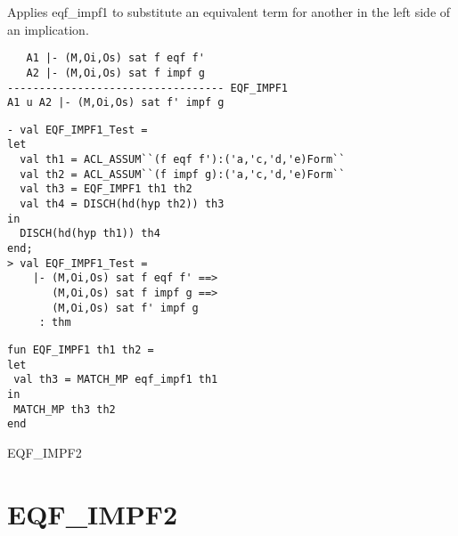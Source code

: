 \SYNOPSIS 
Applies eqf\_impf1 to substitute an equivalent term for
another in the left side of an implication.

\DESCRIBE
\begin{verbatim}
   A1 |- (M,Oi,Os) sat f eqf f'
   A2 |- (M,Oi,Os) sat f impf g
---------------------------------- EQF_IMPF1
A1 u A2 |- (M,Oi,Os) sat f' impf g
\end{verbatim}

\EXAMPLE
\begin{holboxed}
\begin{verbatim}
- val EQF_IMPF1_Test =
let
  val th1 = ACL_ASSUM``(f eqf f'):('a,'c,'d,'e)Form``
  val th2 = ACL_ASSUM``(f impf g):('a,'c,'d,'e)Form``
  val th3 = EQF_IMPF1 th1 th2
  val th4 = DISCH(hd(hyp th2)) th3
in
  DISCH(hd(hyp th1)) th4
end;
> val EQF_IMPF1_Test =
    |- (M,Oi,Os) sat f eqf f' ==>
       (M,Oi,Os) sat f impf g ==>
       (M,Oi,Os) sat f' impf g
     : thm
\end{verbatim}
\end{holboxed}

\IMPLEMENTATION
\begin{holboxed}
\begin{verbatim}
fun EQF_IMPF1 th1 th2 =
let
 val th3 = MATCH_MP eqf_impf1 th1
in
 MATCH_MP th3 th2
end
\end{verbatim}
\end{holboxed}

\SEEALSO
EQF\_IMPF2

\ENDDOC

\section{EQF\_IMPF2}

